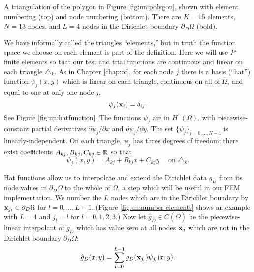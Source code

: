 \begin{marginfigure}


\medskip


\caption{A triangulation of the polygon in Figure \ref{fig:un:polygon}, shown with element numbering (top) and node numbering (bottom).  There are $K=15$ elements, $N=13$ nodes, and $L=4$ nodes in the Dirichlet boundary $\partial_D\Omega$ (bold).}
\label{fig:un:number-mesh}
\end{marginfigure}

We have informally called the triangles ``elements,'' but in truth the function space we choose on each element is part of the definition.  Here we will use $P^1$ finite elements \citep{Elmanetal2005} so that our test and trial functions are continuous and linear on each triangle $\triangle_k$.  As in Chapter \ref{chap:of}, for each node $j$ there is a basis (``hat'') function  $\psi_j(x,y)$ which is linear on each triangle, continuous on all of $\overline{\Omega}$, and equal to one at only one node $j$,
\begin{equation*}
\psi_j(\mathbf{x}_i) = \delta_{ij}.
\end{equation*}
See Figure \ref{fig:un:hatfunction}.  The functions $\psi_j$ are in $H^1(\Omega)$, with piecewise-constant partial derivatives $\partial\psi_j/\partial x$ and $\partial\psi_j/\partial y$.  The set $\{\psi_j\}_{j=0,\dots,N-1}$ is linearly-independent.  On each triangle, $\psi_j$ has three degrees of freedom; there exist coefficients $A_{kj},B_{kj},C_{kj}\in\mathbb{R}$ so that
\begin{equation*}
\psi_j(x,y) = A_{kj} + B_{kj} x + C_{kj} y \quad \text{ on } \triangle_k.
\end{equation*}

Hat functions allow us to interpolate and extend the Dirichlet data $g_D$ from its node values in $\partial_D \Omega$ to the whole of $\overline\Omega$, a step which will be useful in our FEM implementation.  We number the $L$ nodes which are in the Dirichlet boundary by $\mathbf{x}_{j_l} \in \partial_D\Omega$ for $l=0,\dots,L-1$.  (Figure \ref{fig:un:number-elements} shows an example with $L=4$ and $j_l=l$ for $l=0,1,2,3$.)  Now let $\hat g_D \in C(\overline\Omega)$ be the piecewise-linear interpolant of $g_D$ which has value zero at all nodes $\mathbf{x}_j$ which are not in the Dirichlet boundary $\partial_D \Omega$:
\begin{equation}
\hat g_D(x,y) = \sum_{l=0}^{L-1} g_D(\mathbf{x}_{j_l}) \psi_{j_l}(x,y). \label{eq:un:hatgdefine}
\end{equation}


